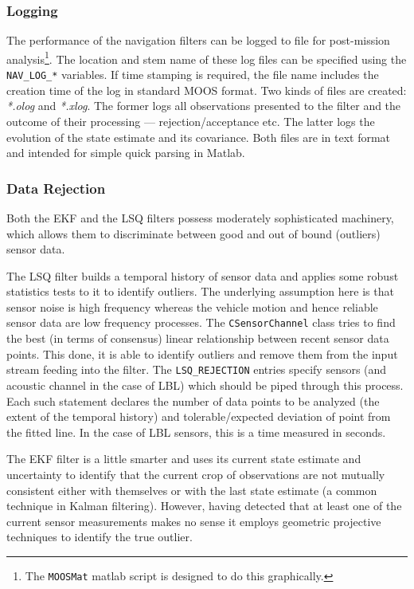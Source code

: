 \documentclass[a4paper,10pt]{article}
\newcommand{\Code}[1]{\texttt{#1} }
\newcommand{\code}[1]{\Code{#1} }
\begin{document}
\subsubsection{Logging}
The performance of the navigation filters can be logged to file
for post-mission analysis\footnote{The \code{MOOSMat} matlab
script is designed to do this graphically.}. The location and stem
name of these log files can be specified using the
\code{NAV\_LOG\_*} variables. If time stamping is required, the
file name includes the creation time of the log in standard MOOS
format. Two kinds of files are created: {\it{*.olog}} and
{\it{*.xlog}}. The former logs all  observations presented to the
filter and the outcome of their processing --- rejection/acceptance
 etc. The latter logs the evolution of the state estimate
and its covariance. Both files are in text format and intended for
 simple quick parsing in Matlab.

\subsubsection{Data Rejection}

Both the EKF and the LSQ filters possess moderately  sophisticated
machinery, which allows them to discriminate between good and out
of bound (outliers) sensor data.

The LSQ filter builds a temporal history of sensor data and
applies some robust statistics tests to it to identify outliers.
The underlying assumption here is that sensor noise is high
frequency whereas the vehicle motion and hence reliable sensor
data are low frequency processes. The \code{CSensorChannel} class
tries to find the best (in terms of consensus) linear relationship
between recent sensor data points. This done, it is able to
identify outliers and remove them from the input stream feeding
into the filter. The  \code{LSQ\_REJECTION} entries specify
sensors (and acoustic channel in the case of LBL) which should be
piped through this process. Each such statement declares the
number of data points to be analyzed (the extent of the temporal
history) and tolerable/expected deviation of point from the fitted
line. In the case of LBL sensors, this is a time measured in
seconds.

The EKF filter is a little smarter and uses its current state
estimate and uncertainty to identify that the current crop of
observations are not mutually consistent either with themselves or
with the last state estimate (a common technique in Kalman
filtering). However, having detected that at least one of the
current sensor measurements makes no sense it employs geometric
projective techniques to identify the true outlier.
\end{document}
